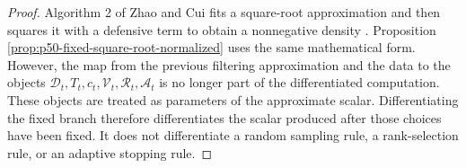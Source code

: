 \documentclass[11pt]{article}
\numberwithin{equation}{section}
\begin{document}
\begin{proof}
Algorithm 2 of Zhao and Cui fits a square-root approximation and then squares it
with a defensive term to obtain a nonnegative density
\cite[Eq.~(13) and Algorithm~2]{zhao2024ttsequential}.  Proposition
\ref{prop:p50-fixed-square-root-normalized} uses the same mathematical form.
However, the map from the previous filtering approximation and the data to the
objects \(\mathcal D_t,T_t,c_t,\mathcal V_t,\mathcal R_t,\mathcal A_t\) is no
longer part of the differentiated computation.  These objects are treated as
parameters of the approximate scalar.  Differentiating the fixed branch
therefore differentiates the scalar produced after those choices have been
fixed.  It does not differentiate a random sampling rule, a rank-selection rule,
or an adaptive stopping rule.
\end{proof}
\end{document}
